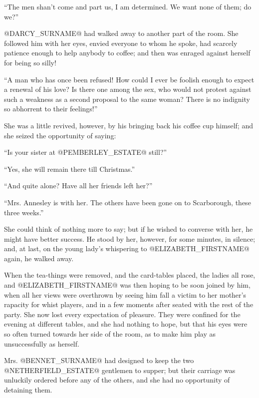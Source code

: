 ``The men shan't come and part us, I am determined. We want none of them;
do we?''

@DARCY_SURNAME@ had walked away to another part of the room. She followed him with
her eyes, envied everyone to whom he spoke, had scarcely patience enough
to help anybody to coffee; and then was enraged against herself for
being so silly!

``A man who has once been refused! How could I ever be foolish enough to
expect a renewal of his love? Is there one among the sex, who would not
protest against such a weakness as a second proposal to the same woman?
There is no indignity so abhorrent to their feelings!''

She was a little revived, however, by his bringing back his coffee cup
himself; and she seized the opportunity of saying:

``Is your sister at @PEMBERLEY_ESTATE@ still?''

``Yes, she will remain there till Christmas.''

``And quite alone? Have all her friends left her?''

``Mrs. Annesley is with her. The others have been gone on to Scarborough,
these three weeks.''

She could think of nothing more to say; but if he wished to converse
with her, he might have better success. He stood by her, however, for
some minutes, in silence; and, at last, on the young lady's whispering
to @ELIZABETH_FIRSTNAME@ again, he walked away.

When the tea-things were removed, and the card-tables placed, the ladies
all rose, and @ELIZABETH_FIRSTNAME@ was then hoping to be soon joined by him,
when all her views were overthrown by seeing him fall a victim to her
mother's rapacity for whist players, and in a few moments after seated
with the rest of the party. She now lost every expectation of pleasure.
They were confined for the evening at different tables, and she had
nothing to hope, but that his eyes were so often turned towards her side
of the room, as to make him play as unsuccessfully as herself.

Mrs. @BENNET_SURNAME@ had designed to keep the two @NETHERFIELD_ESTATE@ gentlemen to
supper; but their carriage was unluckily ordered before any of the
others, and she had no opportunity of detaining them.

